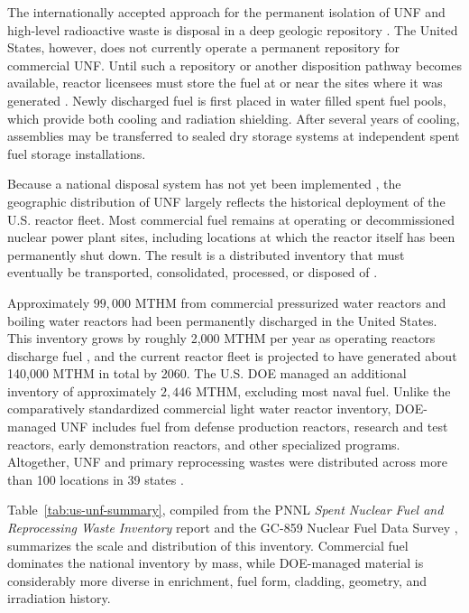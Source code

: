 The internationally accepted approach for the permanent isolation of \gls{UNF} and
high-level radioactive waste is disposal in a deep geologic repository
\cite{doe_waste_strategy_2013}. The United States, however, does not currently
operate a permanent repository for commercial \gls{UNF}. Until such a repository or
another disposition pathway becomes available, reactor licensees must store
the fuel at or near the sites where it was generated
\cite{nrc_high_level_waste,nrc_spent_fuel_storage}. Newly discharged fuel is
first placed in water filled spent fuel pools, which provide both cooling and
radiation shielding. After several years of cooling, assemblies may be
transferred to sealed dry storage systems at independent spent fuel storage
installations.

Because a national disposal system has not yet been implemented \cite{nrc_spent_fuel_storage}, the
geographic distribution of \gls{UNF} largely reflects the historical deployment of
the U.S. reactor fleet. Most commercial fuel remains at operating or
decommissioned nuclear power plant sites, including locations at which the
reactor itself has been permanently shut down. The result is a distributed
inventory that must eventually be transported, consolidated, processed, or
disposed of \cite{carter_banerjee_inventory_2024}.

Approximately \(99{,}000\) \gls{MTHM} from commercial
pressurized water reactors and boiling water reactors
had been permanently discharged in the United States. This inventory grows by
roughly 2,000 \gls{MTHM} per year as operating reactors discharge fuel \cite{GC-859},
and the current reactor fleet is projected to have generated about 140,000 \gls{MTHM}
in total by 2060. The U.S. \gls{DOE} managed an additional inventory
of approximately \(2{,}446\) \gls{MTHM}, excluding most naval fuel.
Unlike the comparatively standardized commercial light water reactor
inventory, \gls{DOE}-managed \gls{UNF} includes fuel from defense production reactors,
research and test reactors, early demonstration reactors, and other specialized
programs. Altogether, \gls{UNF} and primary reprocessing wastes were distributed
across more than 100 locations in 39 states
\cite{carter_banerjee_inventory_2024}.

Table~\ref{tab:us-unf-summary}, compiled from the PNNL \emph{Spent Nuclear
Fuel and Reprocessing Waste Inventory} report
\cite{carter_banerjee_inventory_2024} and the GC-859 Nuclear Fuel Data Survey
\cite{GC-859}, summarizes the scale and distribution of this inventory.
Commercial fuel dominates the national inventory by mass, while
\gls{DOE}-managed material is considerably more diverse in enrichment, fuel
form, cladding, geometry, and irradiation history.


